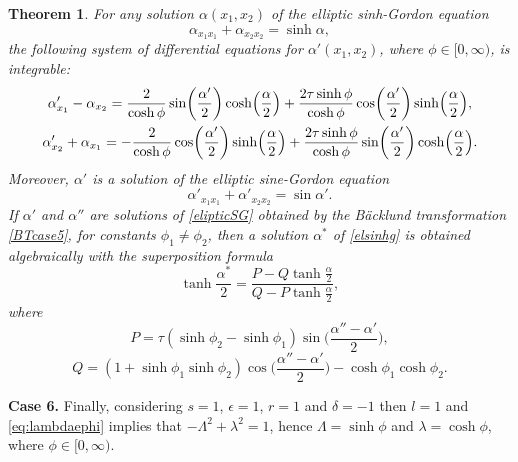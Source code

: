 \documentclass[pdftex]{sigma}
\numberwithin{equation}{section}
\newtheorem{Theorem}{Theorem}[section]
\begin{document}
\begin{Theorem}\label{elipticSinhgordon}
 For any solution $\alpha(x_1,x_2)$ of the elliptic sinh-Gordon equation
\begin{equation}\label{elsinhg}
\alpha_{x_1x_1}+\alpha_{x_2x_2}=\sinh \alpha,
\end{equation}
 the following system of differential equations for $\alpha'(x_1,x_2)$, where $\phi\in [0,\infty)$, is integrable:
\begin{gather}
\alpha'_{x_1}-\alpha_{x_2}=\frac{2}{\cosh\phi}\sin\biggl(\frac{\alpha'}{2}\biggr)\cosh\Bigl(\frac{\alpha}{2}\Bigr)+\frac{2\tau\sinh\phi}{\cosh\phi} \cos\biggl(\frac{\alpha'}{2}\biggr)\sinh\Bigl(\frac{\alpha}{2}\Bigr),\nonumber\\
\alpha'_{x_2}+\alpha_{x_1}=-\frac{2}{\cosh\phi}\cos\biggl(\frac{\alpha'}{2}\biggr)\sinh\Bigl(\frac{\alpha}{2}\Bigr)+\frac{2\tau\sinh\phi}{\cosh\phi} \sin\biggl(\frac{\alpha'}{2}\biggr)\cosh\Bigl(\frac{\alpha}{2}\Bigr).\label{BTcase5}
\end{gather}
 Moreover, $\alpha'$ is a solution of the elliptic sine-Gordon equation
\begin{equation}\label{elipticSG}
\alpha'_{x_1x_1}+\alpha'_{x_2x_2}=\sin \alpha'.
\end{equation}
If $\alpha'$ and $\alpha''$ are solutions of \eqref{elipticSG} obtained by the B\"acklund transformation \eqref{BTcase5}, for constants $\phi_1\neq \phi_2$, then a solution $\alpha^*$ of \eqref{elsinhg} is obtained algebraically with the superposition formula
\begin{equation}\label{superposcase5}
\tanh \frac{\alpha^*}{2}=
 \frac{P-Q\tanh {\frac{\alpha}{2}}} {Q-P \tanh {\frac{\alpha}{2}}},
\end{equation}
where
\[ P=\tau(\sinh\phi_2-\sinh\phi_1) \sin\biggl(\frac{\alpha''-\alpha'}{2}\biggr),
\]
\[
Q=(1+\sinh\phi_1\sinh\phi_2)\cos\biggl(\frac{\alpha''-\alpha'}{2}\biggr) -\cosh\phi_1\cosh\phi_2.
\]
\end{Theorem}

{\bf Case 6.}
Finally, considering $s=1$, $\epsilon=1$, $r=1$ and $\delta=-1$ then $l=1$ and \eqref{eq:lambdaephi} implies that
$-\Lambda^2 +\lambda^2=1$, hence $\Lambda=\sinh\phi$ and $\lambda=\cosh\phi$,
where $\phi\in [0,\infty)$.
\end{document}
